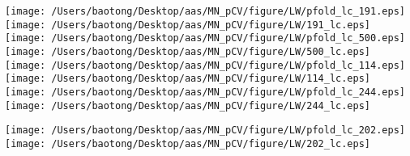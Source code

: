\documentclass{aastex63}
\begin{document}
\clearpage
\begin{figure*}[!ht]
\centering
\texttt{[image: /Users/baotong/Desktop/aas/MN\_pCV/figure/LW/pfold\_lc\_191.eps]}
\hfill
\texttt{[image: /Users/baotong/Desktop/aas/MN\_pCV/figure/LW/191\_lc.eps]}
\hfill
{}
\texttt{[image: /Users/baotong/Desktop/aas/MN\_pCV/figure/LW/pfold\_lc\_500.eps]}
\hfill
\texttt{[image: /Users/baotong/Desktop/aas/MN\_pCV/figure/LW/500\_lc.eps]}
\hfill
{}
\texttt{[image: /Users/baotong/Desktop/aas/MN\_pCV/figure/LW/pfold\_lc\_114.eps]}
\hfill
\texttt{[image: /Users/baotong/Desktop/aas/MN\_pCV/figure/LW/114\_lc.eps]}
\hfill
{}
\texttt{[image: /Users/baotong/Desktop/aas/MN\_pCV/figure/LW/pfold\_lc\_244.eps]}
\hfill
\texttt{[image: /Users/baotong/Desktop/aas/MN\_pCV/figure/LW/244\_lc.eps]}
\hfill
{}
\end{figure*}
\clearpage
\begin{figure*}[!ht]
\centering
\texttt{[image: /Users/baotong/Desktop/aas/MN\_pCV/figure/LW/pfold\_lc\_202.eps]}
\hfill
\texttt{[image: /Users/baotong/Desktop/aas/MN\_pCV/figure/LW/202\_lc.eps]}
\hfill
{}
\end{figure*}
\clearpage
\end{document}
